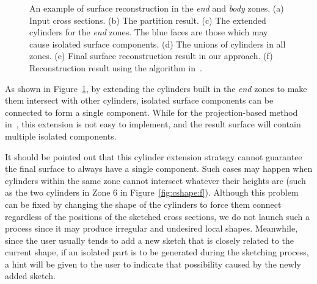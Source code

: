 \begin{figure} [htbp]
{\begin{minipage}[b]{0.3\textwidth}
    \end{minipage}}
  \caption{An example of surface reconstruction in the \textit{end} and \textit{body} zones.
  (a) Input cross sections.
  (b) The partition result.
  (c) The extended cylinders for the \textit{end} zones.  The blue faces are those which may cause isolated surface components.
  (d) The unions of cylinders in all zones.
  (e) Final surface reconstruction result in our approach.
  (f) Reconstruction result using the algorithm in~\cite{LBDLJ08}.}
  \label{fig:partition} %
\end{figure}

As shown in Figure~\ref{fig:partition}, by extending the cylinders
built in the \textit{end} zones to make them intersect with other
cylinders, isolated surface components can be connected to form a
single component. While for the projection-based method
in~\cite{LBDLJ08}, this extension is not easy to implement, and the
result surface will contain multiple isolated components.

It should be pointed out that this cylinder extension  strategy
cannot guarantee the final surface to always have a single
component. Such cases may happen when cylinders within the same zone
cannot intersect whatever their heights are (such as the two
cylinders in Zone 6 in Figure~\ref{fig:cshape:f}). Although this
problem can be fixed by changing the shape of the cylinders to force
them connect regardless of the positions of the sketched cross
sections, we do not launch such a process since it may produce
irregular and undesired local shapes. Meanwhile, since the user
usually tends to add a new sketch that is closely related to the
current shape, if an isolated part is to be generated during the
sketching process, a hint will be given to the user to indicate that
possibility caused by the newly added sketch.


